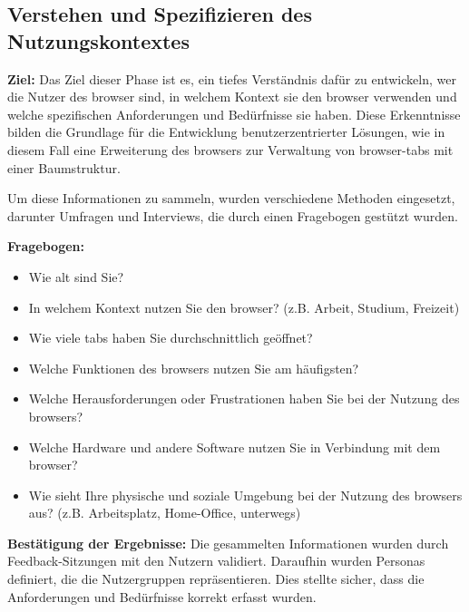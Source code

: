 \subsection{Verstehen und Spezifizieren des Nutzungskontextes}

\textbf{Ziel:} 
Das Ziel dieser Phase ist es, ein tiefes Verständnis dafür zu entwickeln, wer die Nutzer des \gls{browser} sind, in welchem Kontext sie den \gls{browser} verwenden und welche spezifischen Anforderungen und Bedürfnisse sie haben. 
Diese Erkenntnisse bilden die Grundlage für die Entwicklung benutzerzentrierter Lösungen, wie in diesem Fall eine Erweiterung des \gls{browser}s zur Verwaltung von \gls{browser}-\gls{tab}s mit einer Baumstruktur.

Um diese Informationen zu sammeln, wurden verschiedene Methoden eingesetzt, darunter Umfragen und Interviews, die durch einen Fragebogen gestützt wurden.

\textbf{Fragebogen:}
\begin{itemize}
    \item Wie alt sind Sie?
    \item In welchem Kontext nutzen Sie den \gls{browser}? (z.B. Arbeit, Studium, Freizeit)
    \item Wie viele \gls{tab}s haben Sie durchschnittlich geöffnet?
    \item Welche Funktionen des \gls{browser}s nutzen Sie am häufigsten?
    \item Welche Herausforderungen oder Frustrationen haben Sie bei der Nutzung des \gls{browser}s?
    \item Welche Hardware und andere Software nutzen Sie in Verbindung mit dem \gls{browser}?
    \item Wie sieht Ihre physische und soziale Umgebung bei der Nutzung des \gls{browser}s aus? (z.B. Arbeitsplatz, Home-Office, unterwegs)
\end{itemize}

\textbf{Bestätigung der Ergebnisse:}
Die gesammelten Informationen wurden durch Feedback-Sitzungen mit den Nutzern validiert. 
Daraufhin wurden Personas definiert, die die Nutzergruppen repräsentieren. 
Dies stellte sicher, dass die Anforderungen und Bedürfnisse korrekt erfasst wurden.


